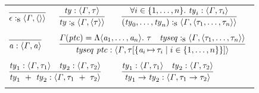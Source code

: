 \documentclass[final]{article}
\begin{document}
\begin{figure}[t]
\begin{small}
\begin{center}
  \begin{tabular}{llll}
    \multicolumn{1}{l}{
      $\MEMinfera
      {\MEMtypingseq{\CONSvoid}{\METAityenv}{\mytuple{}}}$
    }

    &

    \multicolumn{1}{l}{
      $\MEMinferb
      {\MEMtypingseq{\METAty}{\METAityenv}{\mytuple{\METAity}}}
      {\MEMtyping{\METAty}{\METAityenv}{\METAity}}$
    }

    &

    \multicolumn{2}{l}{
      $\MEMinferb
      {\MEMtypingseq{(\METAty_0,\dots,\METAty_n)}{\METAityenv}{\mytuple{\METAity_1,\dots,\METAity_n}}}
      {\forallexp{i\in\{1,\dots,n\}}{\MEMtyping{\METAty_i}{\METAityenv}{\METAity_i}}}$
    }

    \\
    &&&
    \\

    \multicolumn{1}{l}{
      $\MEMinfera
      {\MEMtyping{\METAtyvar}{\METAityenv}{\METAtyvar}}$
    }

    &

    \multicolumn{3}{l}{
      $\MEMinferc
      {\MEMtyping{\CONSconsty{\METAtypseq}{\METAtycon}}{\METAityenv}{\MEMsub{\METAity}{\{\asgn{\METAtyvar_i}{\METAity_i}\mid{i}\in\{1,\dots,n\}\}}}}
      {\MEMafunc{\METAityenv}{\METAtycon}=\CONSityfun{\mytuple{\METAtyvar_1,\dots,\METAtyvar_n}}{\METAity}}
      {\MEMtypingseq{\METAtypseq}{\METAityenv}{\mytuple{\METAity_1,\dots,\METAity_n}}}$
    }

    \\
    &&&
    \\

    \multicolumn{2}{l}{
      $\MEMinferc
      {\MEMtyping{\CONSdisjuty{\METAty_1}{\METAty_2}}{\METAityenv}{\CONSdisjuty{\METAity_1}{\METAity_2}}}
      {\MEMtyping{\METAty_1}{\METAityenv}{\METAity_1}}
      {\MEMtyping{\METAty_2}{\METAityenv}{\METAity_2}}$
    }

    &

    \multicolumn{2}{l}{
      $\MEMinferc
      {\MEMtyping{\CONSarrowty{\METAty_1}{\METAty_2}}{\METAityenv}{\CONSarrowty{\METAity_1}{\METAity_2}}}
      {\MEMtyping{\METAty_1}{\METAityenv}{\METAity_1}}
      {\MEMtyping{\METAty_2}{\METAityenv}{\METAity_2}}$
    }

    \\
    &&&
    \\


\end{tabular}
\end{center}
\end{small}
\end{figure}
\end{document}
